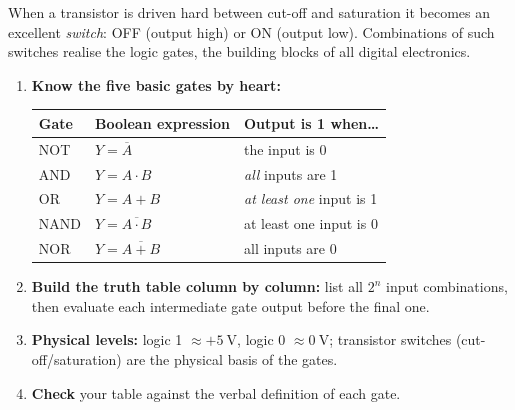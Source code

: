 \documentclass[11pt]{article}
\newcommand{\cle}[1]{{\popxbold\color{popdark}#1}}
\begin{document}
When a transistor is driven hard between cut-off and saturation it becomes an excellent \emph{switch}: OFF (output high) or ON (output low). Combinations of such switches realise the \cle{logic gates}, the building blocks of all digital electronics.

\begin{methode}
\begin{enumerate}
\item \textbf{Know the five basic gates by heart:}
\begin{center}
\begin{tabularx}{\linewidth}{|l|l|X|}
\hline
\rowcolor{popblueL} \textbf{Gate} & \textbf{Boolean expression} & \textbf{Output is 1 when\ldots} \\
\hline
NOT & $Y = \overline{A}$ & the input is 0 \\
\hline
AND & $Y = A\cdot B$ & \emph{all} inputs are 1 \\
\hline
OR & $Y = A + B$ & \emph{at least one} input is 1 \\
\hline
NAND & $Y = \overline{A\cdot B}$ & at least one input is 0 \\
\hline
NOR & $Y = \overline{A + B}$ & all inputs are 0 \\
\hline
\end{tabularx}
\end{center}
\item \textbf{Build the truth table column by column:} list all $2^n$ input combinations, then evaluate each intermediate gate output before the final one.
\item \textbf{Physical levels:} logic 1 $\approx +5\ \mathrm{V}$, logic 0 $\approx 0\ \mathrm{V}$; transistor switches (cut-off/saturation) are the physical basis of the gates.
\item \textbf{Check} your table against the verbal definition of each gate.
\end{enumerate}
\end{methode}
\end{document}
